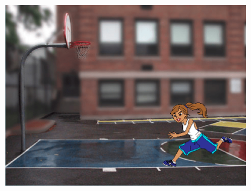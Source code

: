 \documentclass[10pt, a4paper]{article}
\begin{document}
\begin{enumerate}
\begin{figure}[htbp]
\begin{minipage}{.3\textwidth}
                \includegraphics[width=\textwidth]{37-3.png}
            \end{minipage}
        \end{figure}
    \end{enumerate}
\end{document}
